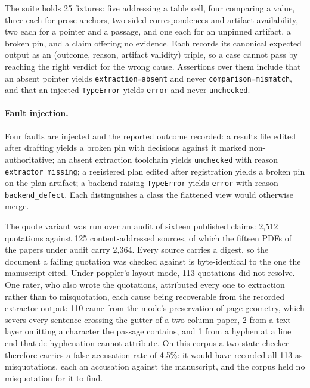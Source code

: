 \documentclass{article}
\newcommand{\code}[1]{\texttt{#1}}
\begin{document}
The suite holds 25 fixtures: five addressing a table cell, four
comparing a value, three each for prose anchors, two-sided correspondences and artifact
availability, two each for a pointer and a passage, and one each for an unpinned artifact, a
broken pin, and a claim offering no evidence. Each records its canonical expected output as an
(outcome, reason, artifact validity) triple, so a case cannot pass by reaching the right verdict
for the wrong cause. Assertions over them include that an absent pointer yields
\code{extraction=absent} and never \code{comparison=mismatch}, and that an injected
\code{TypeError} yields \code{error} and never \code{unchecked}.

\paragraph{Fault injection.}

Four faults are injected and the reported outcome recorded: a results
file edited after drafting yields a broken pin with decisions against it marked non-authoritative;
an absent extraction toolchain yields \code{unchecked} with reason \code{extractor\_missing}; a
registered plan edited after registration yields a broken pin on the plan artifact; a backend
raising \code{TypeError} yields \code{error} with reason \code{backend\_defect}. Each distinguishes
a class the flattened view would otherwise merge.

The quote variant was run over an audit of sixteen published claims:
2{,}512 quotations against 125 content-addressed sources, of which the fifteen PDFs of the papers
under audit carry 2{,}364. Every source carries a digest, so the document a failing quotation was
checked against is byte-identical to the one the manuscript cited. Under poppler's layout mode,
113 quotations did not resolve. One rater, who also wrote the quotations, attributed every one to
extraction rather than to misquotation, each cause being recoverable from the recorded extractor
output: 110 came from the mode's preservation of page geometry, which severs every sentence
crossing the gutter of a two-column paper, 2 from a text layer omitting a character the passage contains, and 1 from a
hyphen at a line end that de-hyphenation cannot attribute. On this corpus a two-state checker therefore carries a false-accusation rate of 4.5\%: it would
have recorded all 113 as misquotations, each an accusation against the manuscript, and the corpus
held no misquotation for it to find.
\end{document}
